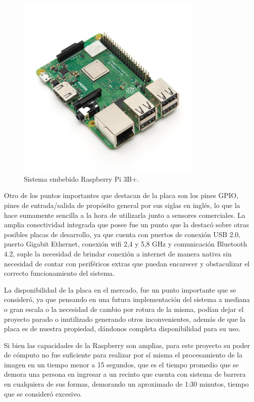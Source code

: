 \begin{figure}
    \centering
    \includegraphics[width=0.8\textwidth]{imgs/Raspberry-pi3b+.jpg}
    \caption{Sistema embebido Raspberry Pi 3B+.}
    \label{fig:raspberry}
\end{figure}
Otro de los puntos importantes que destacan de la placa son los pines GPIO, pines de entrada/salida de propósito general
por sus siglas en inglés, lo que la hace sumamente sencilla a la hora de utilizarla junto a sensores comerciales.
La amplia conectividad integrada que posee fue un punto que la destacó sobre otras posibles placas de desarrollo, ya que
cuenta con puertos de conexión USB 2.0, puerto Gigabit Ethernet, conexión wifi 2,4 y 5,8 GHz y comunicación Bluetooth 4.2,
suple la necesidad de brindar conexión a internet de manera nativa sin necesidad de contar con periféricos extras que
puedan encarecer y obstaculizar el correcto funcionamiento del sistema.


La disponibilidad de la placa en el mercado, fue un punto importante que se consideró, ya que pensando en una futura
implementación del sistema a mediana o gran escala o la necesidad de cambio por rotura de la misma, podían dejar el
proyecto parado o inutilizado generando otros inconvenientes, además de que la placa es de nuestra propiedad, dándonos
completa disponibilidad para su uso.


Si bien las capacidades de la Raspberry son amplias, para este proyecto su poder de cómputo no fue suficiente para realizar
por sí misma el procesamiento de la imagen en un tiempo menor a 15 segundos, que es el tiempo promedio que se demora una persona
en ingresar a un recinto que cuenta con sistema de barrera en cualquiera de sus formas, demorando un aproximado de 1:30 
minutos, tiempo que se consideró excesivo.


